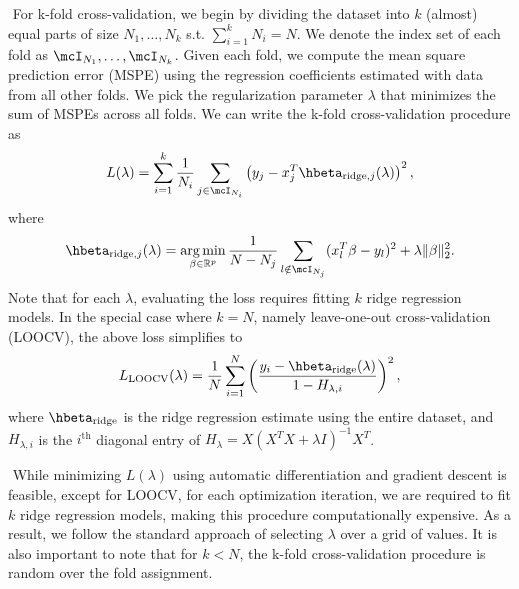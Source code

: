 $ $\newline
For k-fold cross-validation, we begin by dividing the dataset into $k$ (almost) equal parts of size $N_1,\dots, N_k$ s.t. $\sum_{i=1}^k N_i = N$. We denote the index set of each fold as $\mcI_{N_1}, \dots, \mcI_{N_k}$. Given each fold, we compute the mean square prediction error (MSPE) using the regression coefficients estimated with data from all other folds. We pick the regularization parameter $\lambda$ that minimizes the sum of MSPEs across all folds. We can write the k-fold cross-validation procedure as
\[
L(\lambda) = \sum_{i=1}^k \frac{1}{N_i} \sum_{j \in \mcI_{N_i}} \left(y_j - x_j^T\hbeta_{\text{ridge}, j}(\lambda)\right)^2,
\] 
where
\[
\hbeta_{\text{ridge}, j}(\lambda) = \argmin_{\beta\in\reals^p} \frac{1}{N-N_j}\sum_{l\notin\mcI_{N_j}}(x_l^T\beta - y_l)^2 + \lambda \|\beta\|_2^2.
\]
Note that for each $\lambda$, evaluating the loss requires fitting $k$ ridge regression models. In the special case where $k=N$, namely leave-one-out cross-validation (LOOCV), the above loss simplifies to
\[
L_{\text{LOOCV}}(\lambda) = \frac{1}{N}\sum_{i=1}^N \left( \frac{y_i - \hbeta_{\text{ridge}}(\lambda)}{1 - H_{\lambda,i}} \right)^2,
\]
where $\hbeta_{\text{ridge}}$ is the ridge regression estimate using the entire dataset, and $H_{\lambda,i}$ is the $i^\text{th}$ diagonal entry of $H_\lambda = X(X^TX + \lambda I)^{-1}X^T$.

$ $\newline
While minimizing $L(\lambda)$ using automatic differentiation and gradient descent is feasible, except for LOOCV, for each optimization iteration, we are required to fit $k$ ridge regression models, making this procedure computationally expensive. As a result, we follow the standard approach of selecting $\lambda$ over a grid of values. It is also important to note that for $k<N$, the k-fold cross-validation procedure is random over the fold assignment.

